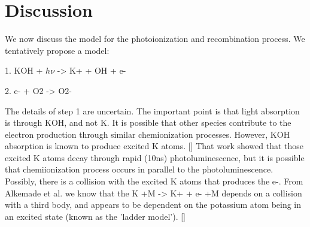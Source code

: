 \section{Discussion}

We now discuss the model for the photoionization and recombination process. We tentatively propose a model:

1. KOH + $h\nu$ -> K+ + OH + e-

2. e- + O2 -> O2-

The details of step 1 are uncertain. The important point is that light absorption is through KOH, and not K. It is possible that other species contribute to the electron production through similar chemionization processes. However, KOH absorption is known to produce excited K atoms. [] That work showed that those excited K atoms decay through rapid (10ns) photoluminescence, but it is possible that chemiionization process occurs in parallel to the photoluminescence. Possibly, there is a collision with the excited K atoms that produces the e-. From Alkemade et al. we know that the K +M -> K+ + e- +M depends on a collision with a third body, and appears to be dependent on the potassium atom being in an excited state (known as the 'ladder model'). []



